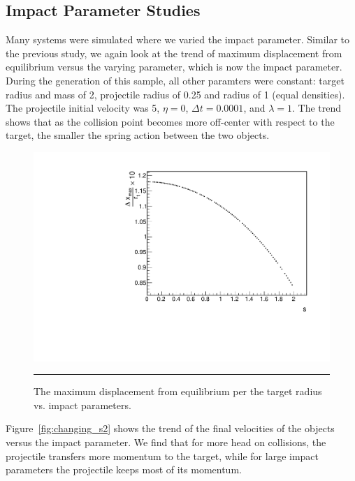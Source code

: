 \documentclass[aps,prl,floatfix,preprint,nofootinbib]{revtex4}
\begin{document}
\subsection{Impact Parameter Studies}
Many systems were simulated where we varied the impact parameter. Similar to the previous study, we again look at the trend of maximum displacement from equilibrium versus the varying parameter, which is now the impact parameter. During the generation of this sample, all other paramters were constant: target radius and mass of 2, projectile radius of 0.25 and radius of 1 (equal densities). The projectile initial velocity was 5, $\eta = 0$, $\Delta t = 0.0001$, and $\lambda = 1$. The trend shows that as the collision point becomes more off-center with respect to the target, the smaller the spring action between the two objects.
\begin{figure}[h!]
  \includegraphics[width=.45\linewidth]{plots/trend_plots/Eloss_vs_s.pdf}
                  {\par\nobreak\rule[9pt]{35em}{0.5pt}\vspace{-5mm}}
                  \caption{The maximum displacement from equilibrium per the target radius vs. impact parameters.}
                  \label{fig:changing_s1}  
\end{figure}
Figure~\ref{fig:changing_s2} shows the trend of the final velocities of the objects versus the impact parameter. We find that for more head on collisions, the projectile transfers more momentum to the target, while for large impact parameters the projectile keeps most of its momentum.
\end{document}
